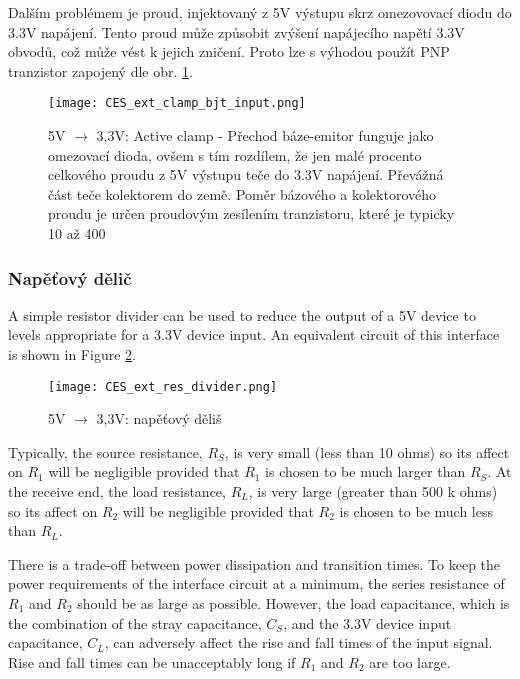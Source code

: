         Dalším problémem je proud, injektovaný z 5V výstupu skrz omezovovací diodu do 3.3V
        napájení. Tento proud může způsobit zvýšení napájecího napětí 3.3V obvodů, což může vést k
        jejich zničení. Proto lze s výhodou použít PNP tranzistor zapojený dle obr.
        \ref{CES:fig_bjt_clamp}.
        
        \begin{figure}[ht!]
          \centering
          \texttt{[image: CES\_ext\_clamp\_bjt\_input.png]}
          \caption{5V $\rightarrow$ 3,3V: Active clamp - Přechod báze-emitor funguje jako omezovací
                   dioda, ovšem s tím rozdílem, že jen malé procento celkového proudu z 5V výstupu
                   teče do 3.3V napájení. Převážná část teče kolektorem do země. Poměr bázového a
                   kolektorového proudu je určen proudovým zesílením tranzistoru, které je typicky
                  10 až 400}
          \label{CES:fig_bjt_clamp}
        \end{figure}              
       
      \subsubsection{Napěťový dělič} %
        A simple resistor divider can be used to reduce the output of a 5V device to levels
        appropriate for a 3.3V device input. An equivalent circuit of this interface is shown in
        Figure \ref{CES:fig_res_divider}.
        \begin{figure}[ht!]
          \centering
          \texttt{[image: CES\_ext\_res\_divider.png]}
          \caption{5V $\rightarrow$ 3,3V: napěťový děliš}
          \label{CES:fig_res_divider}
        \end{figure}
        Typically, the source resistance, $R_S$, is very small (less than 10 ohms) so its affect on
        $R_1$ will be negligible provided that $R_1$ is chosen to be much larger than $R_S$. At the
        receive end, the load resistance, $R_L$, is very large (greater than 500 k ohms) so its
        affect on $R_2$ will be negligible provided that $R_2$ is chosen to be much less than
        $R_L$.
        
        There is a trade-off between power dissipation and transition times. To keep the power
        requirements of the interface circuit at a minimum, the series resistance of $R_1$ and
        $R_2$ should be as large as possible. However, the load capacitance, which is the
        combination of the stray capacitance, $C_S$, and the 3.3V device input capacitance, $C_L$,
        can adversely affect the rise and fall times of the input signal. Rise and fall times can
        be unacceptably long if $R_1$ and $R_2$ are too large.
        
